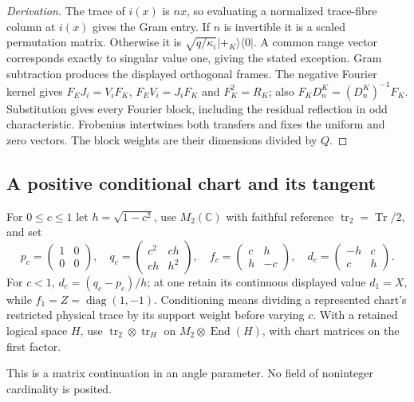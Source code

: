 \begin{proof}[Derivation]
The trace of $i(x)$ is $nx$, so evaluating a normalized trace-fibre column
at $i(x)$ gives the Gram entry. If $n$ is invertible it is a scaled
permutation matrix. Otherwise it is
$\sqrt{q/\kappa_i}|+_K\rangle\langle0|$. A common range vector corresponds
exactly to singular value one, giving the stated exception.
Gram subtraction produces the displayed orthogonal frames. The negative
Fourier kernel gives $F_EJ_i=V_iF_K$, $F_EV_i=J_iF_K$ and $F_K^2=R_K$;
also $F_KD_n^K=(D_n^K)^{-1}F_K$. Substitution gives every Fourier block,
including the residual reflection in odd characteristic. Frobenius
intertwines both transfers and fixes the uniform and zero vectors.
The block weights are their dimensions divided by $Q$.
\end{proof}

\subsection{A positive conditional chart and its tangent}

\begin{definition}
For $0\leq c\leq1$ let $h=\sqrt{1-c^2}$, use $M_2(\mathbb C)$ with
faithful reference $\operatorname{tr}_2=\operatorname{Tr}/2$, and set
\[
 p_c=\begin{pmatrix}1&0\\0&0\end{pmatrix},\quad
 q_c=\begin{pmatrix}c^2&ch\\ch&h^2\end{pmatrix},\quad
 f_c=\begin{pmatrix}c&h\\h&-c\end{pmatrix},\quad
 d_c=\begin{pmatrix}-h&c\\c&h\end{pmatrix}.
\]
For $c<1$, $d_c=(q_c-p_c)/h$; at one retain its continuous displayed
value $d_1=X$, while $f_1=Z=\operatorname{diag}(1,-1)$.
Conditioning means dividing a represented chart's restricted physical
trace by its support weight before varying $c$. With a retained logical
space $H$, use $\operatorname{tr}_2\otimes\operatorname{tr}_H$ on
$M_2\otimes\operatorname{End}(H)$, with chart matrices on the first factor.
\end{definition}
\begin{scope}
This is a matrix continuation in an angle parameter. No field of
noninteger cardinality is posited.
\end{scope}

